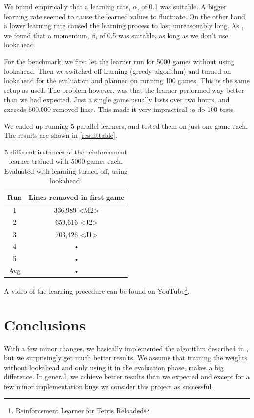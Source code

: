 \documentclass{ml}
\begin{document}
We found empirically that a learning rate, $\alpha$, of 0.1 was suitable. A bigger learning rate seemed to cause the learned values to fluctuate.
On the other hand a lower learning rate caused the learning process to last unreasonably long. 
As \cite{zucker2009learning}, we found that a momentum, $\beta$, of 0.5 was suitable, as long as we don't use lookahead.

For the benchmark, we first let the learner run for 5000 games without using lookahead.
Then we switched off learning (greedy algorithm) and turned on lookahead for the evaluation and planned on running 100 games.
This is the same setup as \cite{zucker2009learning} used.
The problem however, was that the learner performed way better than we had expected. Just a single game usually lasts over two hours, and exceeds 600,000 removed lines.
This made it very impractical to do 100 tests. 

We ended up running 5 parallel learners, and tested them on just one game each. 
The results are shown in \autoref{resulttable}.

\begin{table}
\begin{center}
\begin{tabular}{|c|c|}
\hline 
Run & Lines removed in first game \\ 
\hline 
1 & 336,989 <M2> \\ 
\hline 
2 & 659,616 <J2> \\ 
\hline 
3 & 703,426 <J1> \\ 
\hline 
4 & • \\ 
\hline 
5 & • \\ 
\hline 
Avg & • \\ 
\hline 
\end{tabular}
\caption{5 different instances of the reinforcement learner trained with 5000 games each. Evaluated with learning turned off, using lookahead.}
\label{resulttable}
\end{center}
\end{table}


A video of the learning procedure can be found on YouTube\footnote{\href{http://www.youtube.com/watch?v=DXgtzFiRHdc}{Reinforcement Learner for Tetris Reloaded}}.


\section{Conclusions}
\label{conclusions}

With a few minor changes, we basically implemented the algorithm described in \cite{zucker2009learning}, but we surprisingly get much better results. 
We assume that training the weights without lookahead and only using it in the evaluation phase, makes a big difference. 
In general, we achieve better results than we expected and except for a few minor implementation bugs we consider this project as successful.


\newpage
%


\end{document}
